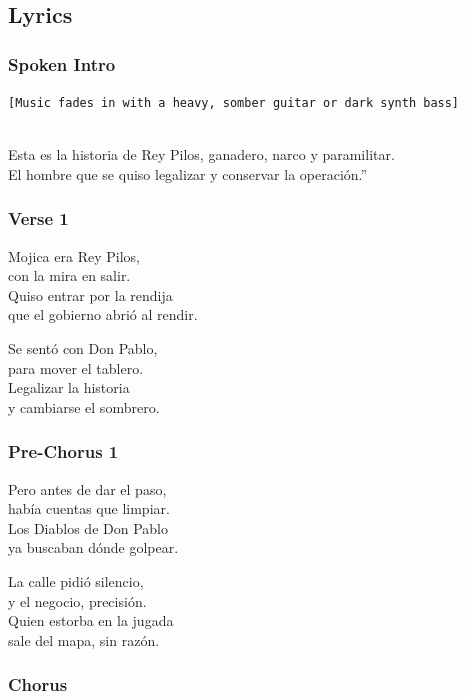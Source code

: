 \subsection{Lyrics}\label{lyrics-22}

\subsubsection{Spoken Intro}\label{spoken-intro}

\texttt{{[}Music\ fades\ in\ with\ a\ heavy,\ somber\ guitar\ or\ dark\ synth\ bass{]}}\strut \\
Esta es la historia de Rey Pilos, ganadero, narco y paramilitar.\\
El hombre que se quiso legalizar y conservar la operación.''

\subsubsection{Verse 1}\label{verse-1-18}

Mojica era Rey Pilos,\\
con la mira en salir.\\
Quiso entrar por la rendija\\
que el gobierno abrió al rendir.

Se sentó con Don Pablo,\\
para mover el tablero.\\
Legalizar la historia\\
y cambiarse el sombrero.

\subsubsection{Pre-Chorus 1}\label{pre-chorus-1-1}

Pero antes de dar el paso,\\
había cuentas que limpiar.\\
Los Diablos de Don Pablo\\
ya buscaban dónde golpear.

La calle pidió silencio,\\
y el negocio, precisión.\\
Quien estorba en la jugada\\
sale del mapa, sin razón.

\subsubsection{Chorus}\label{chorus-59}

